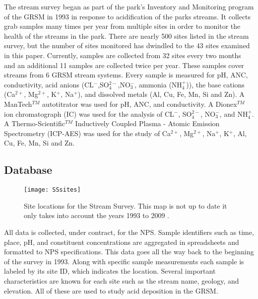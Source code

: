 The stream survey began as part of the park's Inventory and Monitoring program of the GRSM in 1993 in response to acidification of the parks streams.
It collects grab samples many times per year from multiple sites in order to monitor the health of the streams in the park.
There are nearly 500 sites listed in the stream survey, but the number of sites monitored has dwindled to the 43 sites examined in this paper.
Currently, samples are collected from 32 sites every two months and an additional 11 samples are collected twice per year.  
These samples cover streams from 6 GRSM stream systems. 
Every sample is  measured for pH, ANC, conductivity, acid anions (CL$^-$,SO$_4^{2-}$,NO$_3^-$, ammonia (NH$_4^+$)), the base cations (Ca$^{2+}$, Mg$^{2+}$, K$^+$, Na$^+$), and dissolved metals (Al, Cu, Fe, Mn, Si and Zn).  
A ManTech$^{TM}$ autotitrator was used for pH, ANC, and conductivity.  
A Dionex$^{TM}$ ion chromatograph (IC) was used for the analysis of CL$^-$, SO$_4^{2-}$, NO$_3^-$, and NH$_4^+$.  
A Thermo-Scientific$^{TM}$ Inductively Coupled Plasma - Atomic Emission Spectrometry (ICP-AES) was used for the study of Ca$^{2+}$, Mg$^{2+}$, Na$^+$, K$^+$, Al, Cu, Fe, Mn, Si and Zn.

\subsection{Database}

\begin{figure}[h!]
  \centering
  \texttt{[image: SSsites]}\\
  \caption{Site locations for the Stream Survey.  This map is not up to date it only takes into account the years 1993 to 2009 . }\label{fig:SSsites}
\end{figure}

All data is collected, under contract, for the NPS.
Sample identifiers such as time, place, pH, and constituent concentrations are aggregated in spreadsheets and formatted to NPS specifications.
This data goes all the way back to the beginning of the survey in 1993.
Along with specific sample measurements each sample is labeled by its site ID, which indicates the location.
Several important characteristics are known for each site such as the stream name, geology, and elevation.
All of these are used to study acid deposition in the GRSM.

